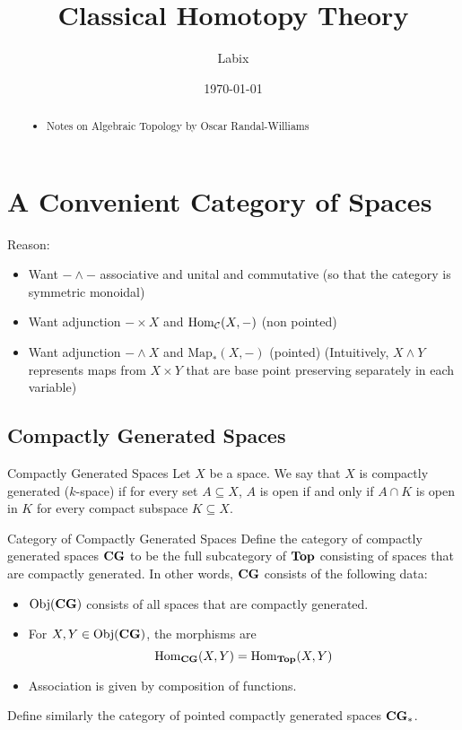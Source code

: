 \documentclass[a4paper]{article}
\title{Classical Homotopy Theory}
\author{Labix}
\date{\today}
\begin{document}
\maketitle
\begin{abstract}
\begin{itemize}
\item Notes on Algebraic Topology by Oscar Randal-Williams
\end{itemize}
\end{abstract}
\pagebreak
\tableofcontents

\pagebreak
\section{A Convenient Category of Spaces}
Reason: 
\begin{itemize}
\item Want $-\wedge-$ associative and unital and commutative (so that the category is symmetric monoidal)
\item Want adjunction $-\times X$ and $\operatorname{Hom}_{\mathcal{C}}(X,-)$ (non pointed)
\item Want adjunction $-\wedge X$ and $\text{Map}_\ast(X,-)$ (pointed) (Intuitively, $X\wedge Y$ represents maps from $X\times Y$ that are base point preserving separately in each variable)
\end{itemize}


\subsection{Compactly Generated Spaces}
\begin{defn}{Compactly Generated Spaces}{} Let $X$ be a space. We say that $X$ is compactly generated ($k$-space) if for every set $A\subseteq X$, $A$ is open if and only if $A\cap K$ is open in $K$ for every compact subspace $K\subseteq X$. 
\end{defn}

\begin{defn}{Category of Compactly Generated Spaces}{} Define the category of compactly generated spaces $\bold{CG}$ to be the full subcategory of $\bold{Top}$ consisting of spaces that are compactly generated. In other words, $\bold{CG}$ consists of the following data: 
\begin{itemize}
\item $\text{Obj}(\bold{CG})$ consists of all spaces that are compactly generated. 
\item For $X,Y\in\text{Obj}(\bold{CG})$, the morphisms are $$\operatorname{Hom}_{\bold{CG}}(X,Y)=\operatorname{Hom}_{\bold{Top}}(X,Y)$$
\item Association is given by composition of functions. 
\end{itemize}
Define similarly the category of pointed compactly generated spaces $\bold{CG}_\ast$. 
\end{defn}
\end{document}
